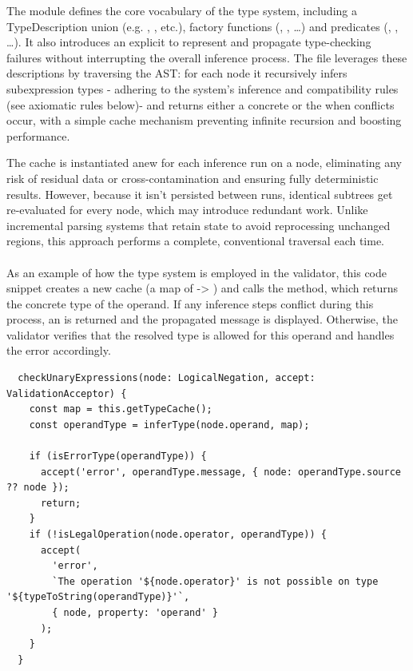 The  module defines the core vocabulary of the type system, including a TypeDescription union (e.g. , , etc.),
factory functions (, , …) and predicates (, , …). It also introduces an explicit
 to represent and propagate type-checking failures without interrupting the overall inference process. The  file leverages these
descriptions by traversing the AST: for each node it recursively infers subexpression types - adhering to the system's inference and compatibility rules (see axiomatic rules below)-
and returns either a concrete  or the  when conflicts occur, with a simple cache mechanism preventing infinite recursion and boosting performance.

The cache is instantiated anew for each inference run on a node, eliminating any risk of residual data or cross-contamination and ensuring fully deterministic results.
However, because it isn't persisted between runs, identical subtrees get re-evaluated for every node, which may introduce redundant work.
Unlike incremental parsing systems that retain state to avoid reprocessing unchanged regions, this approach performs a complete, conventional traversal each time.
\\
\\
As an example of how the type system is employed in the validator, this code snippet creates a new cache (a map of  -> ) and calls the
 method, which returns the concrete type of the operand. If any inference steps conflict during this process, an  is returned and the
propagated message is displayed. Otherwise, the validator verifies that the resolved type is allowed for this operand and handles the error accordingly.

\begin{verbatim}
  checkUnaryExpressions(node: LogicalNegation, accept: ValidationAcceptor) {
    const map = this.getTypeCache();
    const operandType = inferType(node.operand, map);

    if (isErrorType(operandType)) {
      accept('error', operandType.message, { node: operandType.source ?? node });
      return;
    }
    if (!isLegalOperation(node.operator, operandType)) {
      accept(
        'error',
        `The operation '${node.operator}' is not possible on type '${typeToString(operandType)}'`,
        { node, property: 'operand' }
      );
    }
  }
\end{verbatim}
\vspace{0.5em}

